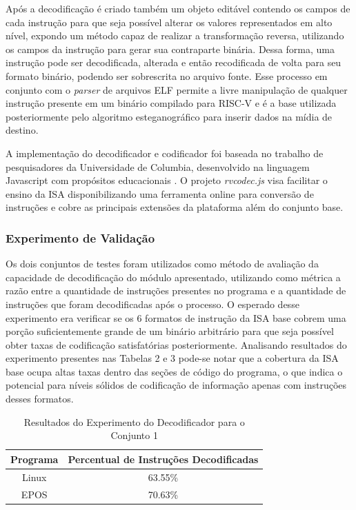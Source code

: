 Após a decodificação é criado também um objeto editável contendo os campos de cada instrução para que seja possível alterar os valores representados em alto nível, expondo um método capaz de realizar a transformação reversa, utilizando os campos da instrução para gerar sua contraparte binária. Dessa forma, uma instrução pode ser decodificada, alterada e então recodificada de volta para seu formato binário, podendo ser sobrescrita no arquivo fonte. Esse processo em conjunto com o \textit{parser} de arquivos ELF permite a livre manipulação de qualquer instrução presente em um binário compilado para RISC-V e é a base utilizada posteriormente pelo algoritmo esteganográfico para inserir dados na mídia de destino.

A implementação do decodificador e codificador foi baseada no trabalho de pesquisadores da Universidade de Columbia, desenvolvido na linguagem Javascript com propósitos educacionais \cite{rvcodec}. O projeto \textit{rvcodec.js} visa facilitar o ensino da ISA disponibilizando uma ferramenta online para conversão de instruções e cobre as principais extensões da plataforma além do conjunto base.

\subsubsection{Experimento de Validação}

Os dois conjuntos de testes foram utilizados como método de avaliação da capacidade de decodificação do módulo apresentado, utilizando como métrica a razão entre a quantidade de instruções presentes no programa e a quantidade de instruções que foram decodificadas após o processo. O esperado desse experimento era verificar se os 6 formatos de instrução da ISA base cobrem uma porção suficientemente grande de um binário arbitrário para que seja possível obter taxas de codificação satisfatórias posteriormente. Analisando resultados do experimento presentes nas Tabelas 2 e 3 pode-se notar que a cobertura da ISA base ocupa altas taxas dentro das seções de código do programa, o que indica o potencial para níveis sólidos de codificação de informação apenas com instruções desses formatos.

\begin{table}[!h]
    \centering
    
    \begin{tabular}{|c|c|}
        \hline
        Programa & Percentual de Instruções Decodificadas \\
        \hline
        Linux & 63.55\% \\
        \hline
        EPOS & 70.63\% \\
        \hline
    \end{tabular}
    \caption{Resultados do Experimento do Decodificador para o Conjunto 1}
    \label{tab:exp1_1}
\end{table}

